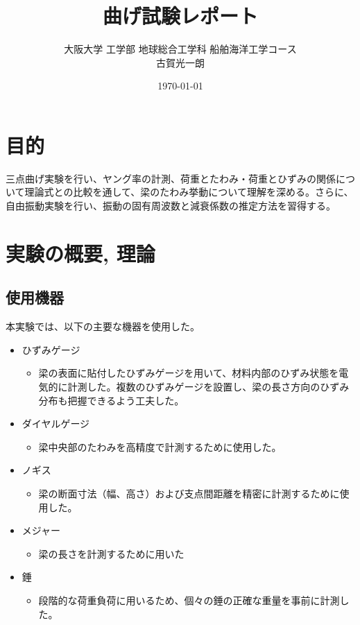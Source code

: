 \documentclass[a4j]{jarticle}
\begin{document}
\title{曲げ試験レポート}
\author{大阪大学 工学部 地球総合工学科 船舶海洋工学コース \\ 古賀光一朗}
\date{\today}
\maketitle

\section{目的}
三点曲げ実験を行い、ヤング率の計測、荷重とたわみ・荷重とひずみの関係について理論式との比較を通して、梁のたわみ挙動について理解を深める。さらに、自由振動実験を行い、振動の固有周波数と減衰係数の推定方法を習得する。

\section{実験の概要, 理論}
\subsection{使用機器}
本実験では、以下の主要な機器を使用した。
\begin{itemize}
    \item ひずみゲージ
    \begin{itemize}
        \item 梁の表面に貼付したひずみゲージを用いて、材料内部のひずみ状態を電気的に計測した。複数のひずみゲージを設置し、梁の長さ方向のひずみ分布も把握できるよう工夫した。
    \end{itemize}
    \item ダイヤルゲージ
    \begin{itemize}
        \item 梁中央部のたわみを高精度で計測するために使用した。
    \end{itemize}
    \item ノギス
    \begin{itemize}
        \item 梁の断面寸法（幅、高さ）および支点間距離を精密に計測するために使用した。
    \end{itemize}
    \item メジャー
    \begin{itemize}
        \item 梁の長さを計測するために用いた
    \end{itemize}
    \item 錘
    \begin{itemize}
        \item 段階的な荷重負荷に用いるため、個々の錘の正確な重量を事前に計測した。
    \end{itemize}
\end{itemize}
\end{document}

